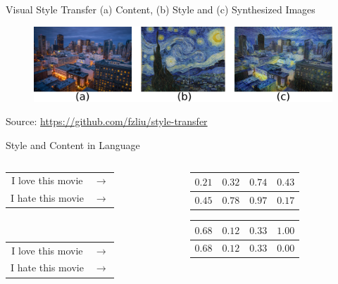 \documentclass[aspectratio=169]{beamer}
\newcommand{\imgsrc}[1]{\tiny{Source: #1}}
\begin{document}
\begin{frame}{Visual Style Transfer}
	\centering
	(a) Content, (b) Style and (c) Synthesized Images
	\begin{figure}[ht]
		\includegraphics[width=\textwidth]{images/style-transfer-vision}
	\end{figure}
	\imgsrc{\url{https://github.com/fzliu/style-transfer}}
\end{frame}

\begin{frame}{Style and Content in Language}
	\centering
	\begin{columns}[T]
		\begin{column}{.3\textwidth}
			\centering
			\begin{tabular}{ c c }
				I love this movie & $\rightarrow$ \\
				I hate this movie & $\rightarrow$ \\
			\end{tabular} \\
			\vspace{1.8cm}
			{\color{white} \begin{tabular}{ c c }
					I love this movie & $\rightarrow$ \\
					I hate this movie & $\rightarrow$ \\
				\end{tabular}}
		\end{column}
		\hfill
		\begin{column}{.6\textwidth}
			\centering
			\begin{tabular}{ | c | c | c | c | }
				\hline
				$0.21$ & $0.32$ & $0.74$ & $0.43$ \\
				\hline
				\hline
				$0.45$ & $0.78$ & $0.97$ & $0.17$ \\
				\hline
			\end{tabular}
			{\color{white}{\Huge$$\Downarrow$$}
			\begin{tabular}{ | c | c | c | c | }
				\hline
				$0.68$ & $0.12$ & $0.33$ & $1.00$ \\
				\hline
				\hline
				$0.68$ & $0.12$ & $0.33$ & $0.00$ \\
				\hline
			\end{tabular}}
		\end{column}
	\end{columns}
\end{frame}
\end{document}
